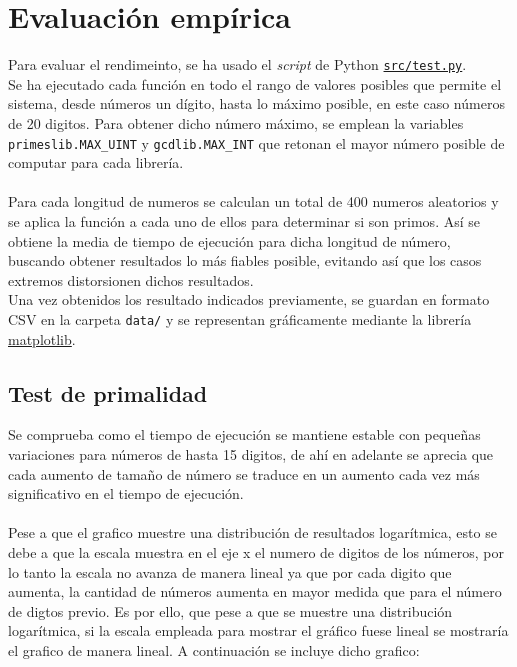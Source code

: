 \section{Evaluación empírica}

Para evaluar el rendimeinto, se ha usado el \textit{script} de Python \href{run:./src/test.py}{\texttt{src/test.py}}.\\
Se ha ejecutado cada función en todo el rango de valores posibles que permite el sistema, desde números un dígito, hasta lo máximo posible, en este caso números de 20 digitos. Para obtener dicho número máximo, se emplean la variables \texttt{primeslib.MAX\_UINT} y \texttt{gcdlib.MAX\_INT} que retonan el mayor número posible de computar para cada librería.\\
\\
Para cada longitud de numeros se calculan un total de 400 numeros aleatorios y se aplica la función a cada uno de ellos para determinar si son primos. Así se obtiene la media de tiempo de ejecución para dicha longitud de número, buscando obtener resultados lo más fiables posible, evitando así que los casos extremos distorsionen dichos resultados.\\

Una vez obtenidos los resultado indicados previamente, se guardan en formato CSV en la carpeta \texttt{data/} y se representan gráficamente mediante la librería \href{https://matplotlib.org/}{matplotlib}.

\subsection{Test de primalidad}
Se comprueba como el tiempo de ejecución se mantiene estable con pequeñas variaciones para números de hasta 15 digitos, de ahí en adelante se aprecia que cada aumento de tamaño de número se traduce en un aumento cada vez más significativo en el tiempo de ejecución.\\
\\
Pese a que el grafico muestre una distribución de resultados logarítmica, esto se debe a que la escala muestra en el eje x el numero de digitos de los números, por lo tanto la escala no avanza de manera lineal ya que por cada digito que aumenta, la cantidad de números aumenta en mayor medida que para el número de digtos previo. Es por ello, que pese a que se muestre una distribución logarítmica, si la escala empleada para mostrar el gráfico fuese lineal se mostraría el grafico de manera lineal. A continuación se incluye dicho grafico:

